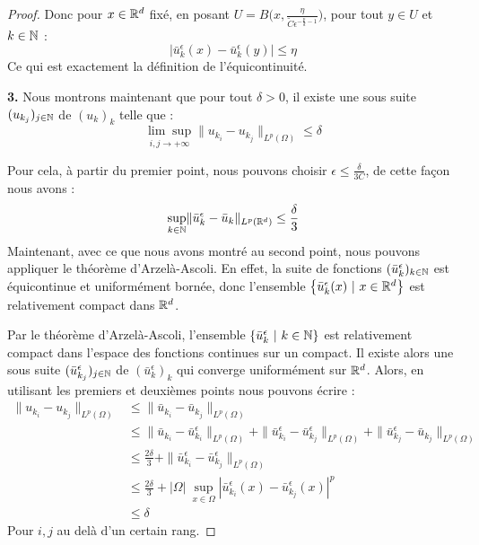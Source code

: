 \begin{proof}
    Donc pour $x \in \mathbb{R}^d$ fixé, en posant $U = B\Big(x,\frac{\eta}{\tilde{C}\epsilon^{-\frac{p}{d} - 1}}\Big)$, pour tout $y\in U$ et $k\in \mathbb{N}$ :
    $$|\bar{u}_k^{\epsilon}(x) - \bar{u}_k^{\epsilon}(y)| \leq \eta $$
    Ce qui est exactement la définition de l'équicontinuité.
    \vspace{1em}

    \textbf{3.}
    Nous montrons maintenant que pour tout $\delta >0$, il existe une sous suite $(u_{k_j})_{j \in \mathbb{N}}$ de $(u_k)_k$ telle que :
    $$\underset{i,j \to +\infty}{\lim\sup} \| u_{k_i} - u_{k_j} \|_{L^p(\Omega)} \leq \delta$$

    Pour cela, à partir du premier point, nous pouvons choisir $\epsilon \leq \frac{\delta}{3C}$, de cette façon nous avons :
    $$ \underset{k \in \mathbb{N}}{\sup} \| \bar{u}_k^{\epsilon} - \bar{u}_k \|_{L^p(\mathbb{R}^d)} \leq \frac{\delta}{3} $$
    Maintenant, avec ce que nous avons montré au second point, nous pouvons appliquer le théorème d'Arzelà-Ascoli.
    En effet, la suite de fonctions $(\bar{u}_k^{\epsilon})_{k \in \mathbb{N}}$ est équicontinue et uniformément bornée, donc l'ensemble $\big\{ \bar{u}_k^{\epsilon}(x) \ | \ x \in \mathbb{R}^d \big\}$ est relativement compact dans $\mathbb{R}^d$.

    Par le théorème d'Arzelà-Ascoli, l'ensemble $\{ \bar{u}_k^{\epsilon} \ | \ k \in \mathbb{N} \}$ est relativement compact dans l'espace des fonctions continues sur un compact.
    Il existe alors une sous suite $(\bar{u}_{k_j}^{\epsilon})_{j\in\mathbb{N}}$ de $(\bar{u}_k^{\epsilon})_k$ qui converge uniformément sur $\mathbb{R}^d$. Alors, en utilisant les premiers et deuxièmes points nous pouvons écrire :
    \begin{equation*}
    \begin{split}
        \| u_{k_i} - u_{k_j} \|_{L^p(\Omega)} &\leq \| \bar{u}_{k_i} - \bar{u}_{k_j} \|_{L^p(\Omega)} \\
        &\leq \| \bar{u}_{k_i} - \bar{u}_{k_i}^{\epsilon} \|_{L^p(\Omega)} + \| \bar{u}_{k_i}^{\epsilon} - \bar{u}_{k_j}^{\epsilon} \|_{L^p(\Omega)} + \| \bar{u}_{k_j}^{\epsilon} - \bar{u}_{k_j} \|_{L^p(\Omega)} \\
        &\leq \frac{2\delta}{3} + \| \bar{u}_{k_i}^{\epsilon} - \bar{u}_{k_j}^{\epsilon} \|_{L^p(\Omega)} \\
        &\leq \frac{2\delta}{3} + |\Omega| \ \underset{x \in \Omega}{\sup}|\bar{u}_{k_i}^{\epsilon}(x) - \bar{u}_{k_j}^{\epsilon}(x)|^p \\
        &\leq \delta
    \end{split}
    \end{equation*}
    Pour $i,j$ au delà d'un certain rang.


\end{proof}
